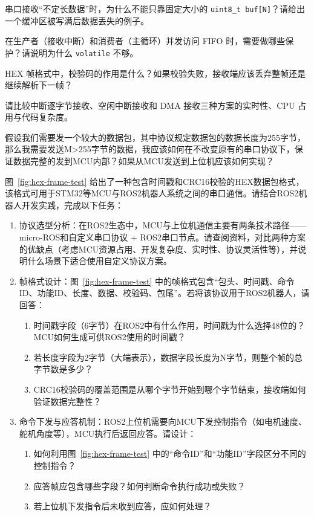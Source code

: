 \begin{problemset}
\item 串口接收“不定长数据”时，为什么不能只靠固定大小的 \texttt{uint8\_t buf[N]}？请给出一个缓冲区被写满后数据丢失的例子。
\item 在生产者（接收中断）和消费者（主循环）并发访问 FIFO 时，需要做哪些保护？请说明为什么 \texttt{volatile} 不够。
\item HEX 帧格式中，校验码的作用是什么？如果校验失败，接收端应该丢弃整帧还是继续解析下一帧？
\item 请比较中断逐字节接收、空闲中断接收和 DMA 接收三种方案的实时性、CPU 占用与代码复杂度。
\item 假设我们需要发一个较大的数据包，其中协议规定数据包的数据长度为255字节，那么我需要发送M>255字节的数据，我应该如何在不改变原有的串口协议下，保证数据完整的发到MCU内部？如果从MCU发送到上位机应该如何实现？
\item 图~\ref{fig:hex-frame-test} 给出了一种包含时间戳和CRC16校验的HEX数据包格式，该格式可用于STM32等MCU与ROS2机器人系统之间的串口通信。请结合ROS2机器人开发实践，完成以下任务：

\begin{enumerate}
	\item 协议选型分析：在ROS2生态中，MCU与上位机通信主要有两条技术路径——micro-ROS和自定义串口协议 + ROS2串口节点。请查阅资料，对比两种方案的优缺点（考虑MCU资源占用、开发复杂度、实时性、协议灵活性等），并说明什么场景下适合使用自定义协议方案。
	
	\item 帧格式设计：图~\ref{fig:hex-frame-test} 中的帧格式包含“包头、时间戳、命令ID、功能ID、长度、数据、校验码、包尾”。若将该协议用于ROS2机器人，请回答：
	\begin{enumerate}
		\item 时间戳字段（6字节）在ROS2中有什么作用，时间戳为什么选择48位的？MCU如何生成可供ROS2使用的时间戳？
		\item 若长度字段为2字节（大端表示），数据字段长度为N字节，则整个帧的总字节数是多少？
		\item CRC16校验码的覆盖范围是从哪个字节开始到哪个字节结束，接收端如何验证数据完整性？
	\end{enumerate}
	
	\item 命令下发与应答机制：ROS2上位机需要向MCU下发控制指令（如电机速度、舵机角度等），MCU执行后返回应答。请设计：
	\begin{enumerate}
		\item 如何利用图~\ref{fig:hex-frame-test} 中的“命令ID”和“功能ID”字段区分不同的控制指令？
		\item 应答帧应包含哪些字段？如何判断命令执行成功或失败？
		\item 若上位机下发指令后未收到应答，应如何处理？
	\end{enumerate}
\end{enumerate}
\end{problemset}

